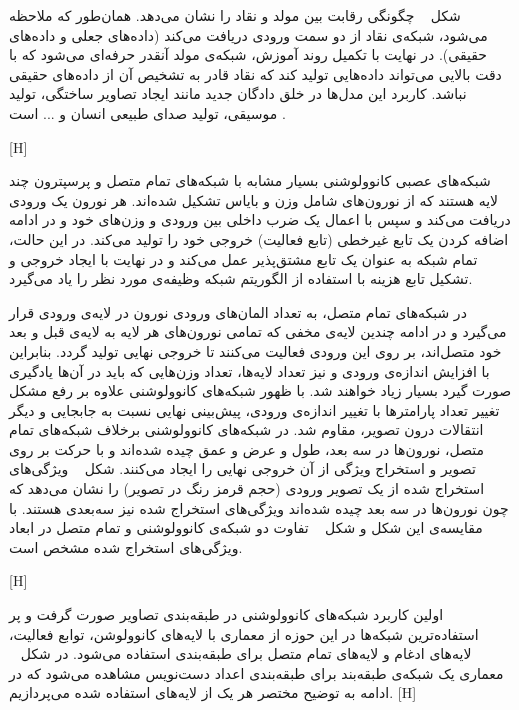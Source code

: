 شکل ~ چگونگی رقابت بین مولد و نقاد را نشان می‌دهد. همان‌طور که ملاحظه می‌شود، شبکه‌ی نقاد از دو سمت ورودی دریافت می‌کند (داده‌های جعلی و داده‌های حقیقی). در نهایت با تکمیل روند آموزش، شبکه‌ی مولد آنقدر حرفه‌ای می‌شود که با دقت بالایی می‌تواند داده‌هایی تولید کند که نقاد قادر به تشخیص آن از داده‌های حقیقی نباشد. کاربرد این مدل‌ها در خلق دادگان جدید مانند ایجاد تصاویر ساختگی، تولید موسیقی، تولید صدای طبیعی انسان و ... است .

[H]
 
شبکه‌های عصبی کانوولوشنی بسیار مشابه با شبکه‌های تمام متصل و پرسپترون چند لایه هستند که از نورون‌های شامل وزن و بایاس تشکیل شده‌اند. هر نورون‌ یک ورودی دریافت می‌کند و سپس با اعمال یک ضرب داخلی بین ورودی و وزن‌های خود و در ادامه اضافه کردن یک تابع غیرخطی (تابع فعالیت) خروجی خود را تولید می‌کند. در این حالت، تمام شبکه به عنوان یک تابع مشتق‌پذیر عمل می‌کند و در نهایت با ایجاد خروجی و تشکیل تابع هزینه با استفاده از الگوریتم  شبکه وظیفه‌ی مورد نظر را یاد می‌گیرد.

در شبکه‌های تمام متصل، به تعداد المان‌های ورودی نورون در لایه‌ی ورودی قرار می‌گیرد و در ادامه چندین لایه‌ی مخفی که تمامی نورون‌های هر لایه به لایه‌ی قبل و بعد خود متصل‌اند، بر روی این ورودی فعالیت می‌کنند تا خروجی نهایی تولید گردد. بنابراین با افزایش اندازه‌ی ورودی و نیز تعداد لایه‌ها، تعداد وزن‌هایی که باید در آن‌ها یادگیری صورت گیرد بسیار زیاد خواهند شد. با ظهور شبکه‌های کانوولوشنی علاوه بر رفع مشکل تغییر تعداد پارامترها با تغییر اندازه‌ی ورودی، پیش‌بینی نهایی نسبت به جابجایی و دیگر انتقالات درون تصویر، مقاوم شد. در شبکه‌های کانوولوشنی برخلاف شبکه‌های تمام متصل، نورون‌ها در سه بعد، طول و عرض و عمق چیده شده‌اند و با حرکت بر روی تصویر و استخراج ویژگی از آن خروجی نهایی را ایجاد می‌کنند. شکل ~ ویژگی‌های استخراج شده از یک تصویر ورودی (حجم قرمز رنگ در تصویر) را نشان می‌دهد که چون نورون‌ها در سه بعد چیده شده‌اند ویژگی‌های استخراج شده نیز سه‌بعدی هستند. با مقایسه‌‌ی این شکل و شکل ~  تفاوت دو شبکه‌ی کانوولوشنی و تمام متصل در ابعاد ویژگی‌های استخراج شده مشخص است.

[H]

اولین کاربرد شبکه‌های کانوولوشنی در طبقه‌بندی تصاویر صورت گرفت و پر استفاده‌ترین شبکه‌ها در این حوزه از معماری با لایه‌های کانوولوشن، توابع فعالیت، لایه‌های ادغام و لایه‌های تمام متصل برای طبقه‌بندی استفاده می‌شود. در شکل ~ معماری یک شبکه‌ی طبقه‌بند برای طبقه‌بندی اعداد دست‌نویس مشاهده می‌شود که در ادامه به توضیح مختصر هر یک از لایه‌های استفاده شده می‌پردازیم.
[H]

